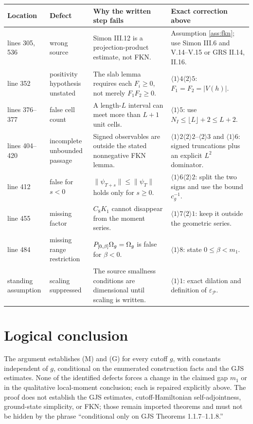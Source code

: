 \documentclass[11pt,a4paper]{article}
\begin{document}
\begin{longtable}{P{1.8cm}P{3.0cm}P{4.5cm}P{5.0cm}}
\toprule
Location & Defect & Why the written step fails & Exact correction above\\
\midrule
\endhead
lines 305, 536 & wrong source & Simon III.12 is a projection-product estimate, not FKN. &
Assumption \ref{ass:fkn}; use Simon III.6 and V.14--V.15 or GRS II.14, II.16.\\
line 352 & positivity hypothesis unstated & The slab lemma requires each $F_i\geq0$, not merely $F_1F_2\geq0$. &
$\langle1\rangle4\langle2\rangle5$: $F_1=F_2=|V(h)|$.\\
lines 376--377 & false cell count & A length-$L$ interval can meet more than $L+1$ unit cells. &
$\langle1\rangle5$: use $N_I\leq\lfloor L\rfloor+2\leq L+2$.\\
lines 404--420 & incomplete unbounded passage & Signed observables are outside the stated nonnegative FKN lemma. &
$\langle1\rangle2\langle2\rangle2$--$\langle2\rangle3$ and
$\langle1\rangle6$: signed truncations plus an explicit $L^2$ dominator.\\
line 412 & false for $s<0$ & $\|\psi_{T+s}\|\leq\|\psi_T\|$ holds only for $s\geq0$. &
$\langle1\rangle6\langle2\rangle2$: split the two signs and use the bound $c_g^{-1}$.\\
line 455 & missing factor & $C_8K_1$ cannot disappear from the moment series. &
$\langle1\rangle7\langle2\rangle1$: keep it outside the geometric series.\\
line 484 & missing range restriction & $P_{[0,\beta]}\Omega_g=\Omega_g$ is false for $\beta<0$. &
$\langle1\rangle8$: state $0\leq\beta<m_1$.\\
standing assumption & scaling suppressed & The source smallness conditions are dimensional until scaling is written. &
$\langle1\rangle1$: exact dilation and definition of $\varepsilon_{\mathscr P}$.\\
\bottomrule
\end{longtable}

\section{Logical conclusion}

The argument establishes (M) and (G) for every cutoff $g$, with constants independent
of $g$, conditional on the enumerated construction facts and the GJS estimates.  None of
the identified defects forces a change in the claimed gap $m_1$ or in the qualitative
local-moment conclusion; each is repaired explicitly above.  The proof does not establish
the GJS estimates, cutoff-Hamiltonian self-adjointness, ground-state simplicity, or FKN;
those remain imported theorems and must not be hidden by the phrase ``conditional only on
GJS Theorems 1.1.7--1.1.8.''
\end{document}
